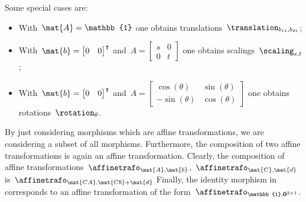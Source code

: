 \begin{solution}
\begin{itemize}
              Some special cases are:
              \begin{itemize}
                  \item With~$\mat{A}=\mathbb{1}$ one obtains translations~$\translation_{b_{11},b_{21}}$;
                  \item With~$\mat{b}=\begin{bmatrix}
                                0 & 0
                            \end{bmatrix}^\intercal$ and~$A=\begin{bmatrix}
                                s & 0 \\0& t
                            \end{bmatrix}$ one obtains scalings~$\scaling_{s,t}$;
                  \item With~$\mat{b}=\begin{bmatrix}
                                0 & 0
                            \end{bmatrix}^\intercal$ and~$A=\begin{bmatrix}
                                \cos(\theta) & \sin(\theta) \\-\sin(\theta)& \cos(\theta)
                            \end{bmatrix}$ one obtains rotations~$\rotation_{\theta}$.
              \end{itemize}
              By just considering morphisms which are affine transformations, we are considering a subset of all morphisms.
              Furthermore, the composition of two affine transformations is again an affine transformation.
              Clearly, the composition of affine transformations~$\affinetrafo_{\mat{A},\mat{b}}$,~$\affinetrafo_{\mat{C},\mat{d}}$ is~$\affinetrafo_{\mat{CA},\mat{Cb}+\mat{d}}$
              Finally, the identity morphism in \Draw corresponds to an affine transformation of the form~$\affinetrafo_{\mathbb{1},\mathbf{0}^{2\times 1}}$.
    \end{itemize}
\end{solution}

